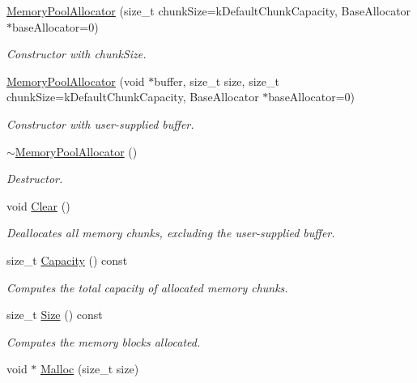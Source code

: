 \begin{DoxyCompactItemize}
\item 
\hyperlink{classMemoryPoolAllocator_aeec85ac657f242ac5620115141be5209}{Memory\+Pool\+Allocator} (size\+\_\+t chunk\+Size=k\+Default\+Chunk\+Capacity, Base\+Allocator $\ast$base\+Allocator=0)
\begin{DoxyCompactList}\small\item\em Constructor with chunk\+Size. \end{DoxyCompactList}\item 
\hyperlink{classMemoryPoolAllocator_a1f0d865093fdb955d956b7a445a8ddbf}{Memory\+Pool\+Allocator} (void $\ast$buffer, size\+\_\+t size, size\+\_\+t chunk\+Size=k\+Default\+Chunk\+Capacity, Base\+Allocator $\ast$base\+Allocator=0)
\begin{DoxyCompactList}\small\item\em Constructor with user-\/supplied buffer. \end{DoxyCompactList}\item 
\hyperlink{classMemoryPoolAllocator_ad4eee0ef3cfe8cda31034fbce98b7a9b}{$\sim$\+Memory\+Pool\+Allocator} ()
\begin{DoxyCompactList}\small\item\em Destructor. \end{DoxyCompactList}\item 
void \hyperlink{classMemoryPoolAllocator_a57bbc80e570db6110901b9a7e36dbda0}{Clear} ()\hypertarget{classMemoryPoolAllocator_a57bbc80e570db6110901b9a7e36dbda0}{}\label{classMemoryPoolAllocator_a57bbc80e570db6110901b9a7e36dbda0}

\begin{DoxyCompactList}\small\item\em Deallocates all memory chunks, excluding the user-\/supplied buffer. \end{DoxyCompactList}\item 
size\+\_\+t \hyperlink{classMemoryPoolAllocator_ac4738338f038d040641f23aa7955e2d3}{Capacity} () const 
\begin{DoxyCompactList}\small\item\em Computes the total capacity of allocated memory chunks. \end{DoxyCompactList}\item 
size\+\_\+t \hyperlink{classMemoryPoolAllocator_a2ccb6c068b8b35dbc3680dc5563af2f4}{Size} () const 
\begin{DoxyCompactList}\small\item\em Computes the memory blocks allocated. \end{DoxyCompactList}\item 
void $\ast$ \hyperlink{classMemoryPoolAllocator_a02f6832910453446cb77bf919ba49e99}{Malloc} (size\+\_\+t size)\hypertarget{classMemoryPoolAllocator_a02f6832910453446cb77bf919ba49e99}{}\label{classMemoryPoolAllocator_a02f6832910453446cb77bf919ba49e99}


\end{DoxyCompactItemize}
